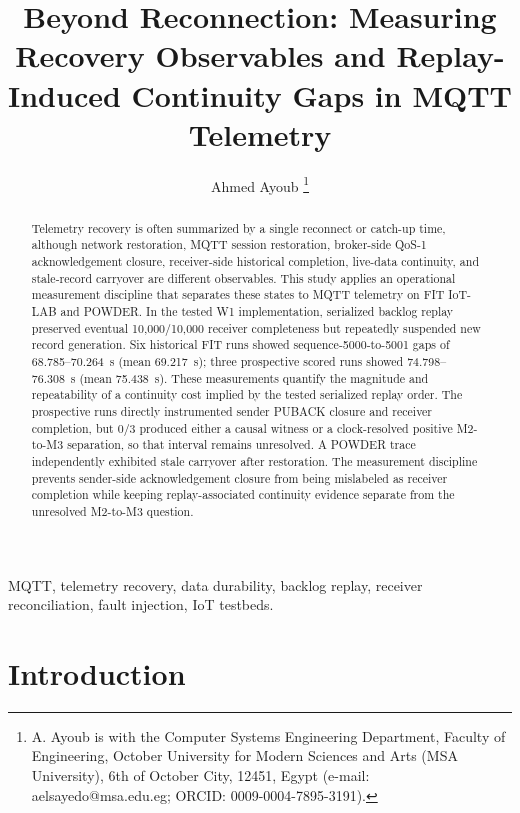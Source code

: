\documentclass[journal]{IEEEtran}
\begin{document}
\title{Beyond Reconnection: Measuring Recovery Observables and Replay-Induced Continuity Gaps in MQTT Telemetry}

\author{Ahmed Ayoub%
\thanks{A. Ayoub is with the Computer Systems Engineering Department, Faculty of Engineering, October University for Modern Sciences and Arts (MSA University), 6th of October City, 12451, Egypt (e-mail: aelsayedo@msa.edu.eg; ORCID: 0009-0004-7895-3191).}}

\maketitle

\begin{abstract}
Telemetry recovery is often summarized by a single reconnect or catch-up time, although network restoration, MQTT session restoration, broker-side QoS-1 acknowledgement closure, receiver-side historical completion, live-data continuity, and stale-record carryover are different observables. This study applies an operational measurement discipline that separates these states to MQTT telemetry on FIT IoT-LAB and POWDER. In the tested W1 implementation, serialized backlog replay preserved eventual 10,000/10,000 receiver completeness but repeatedly suspended new record generation. Six historical FIT runs showed sequence-5000-to-5001 gaps of 68.785--70.264~s (mean 69.217~s); three prospective scored runs showed 74.798--76.308~s (mean 75.438~s). These measurements quantify the magnitude and repeatability of a continuity cost implied by the tested serialized replay order. The prospective runs directly instrumented sender PUBACK closure and receiver completion, but 0/3 produced either a causal witness or a clock-resolved positive M2-to-M3 separation, so that interval remains unresolved. A POWDER trace independently exhibited stale carryover after restoration. The measurement discipline prevents sender-side acknowledgement closure from being mislabeled as receiver completion while keeping replay-associated continuity evidence separate from the unresolved M2-to-M3 question.
\end{abstract}

\begin{IEEEkeywords}
MQTT, telemetry recovery, data durability, backlog replay, receiver reconciliation, fault injection, IoT testbeds.
\end{IEEEkeywords}

\section{Introduction}
\label{sec:introduction}
\end{document}
